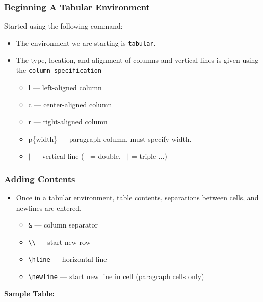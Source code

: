 \documentclass[notes=only]{beamer}
\newcommand{\snip}[1]
{
	
}
\newcommand{\pc}[1]
{
    \texttt{\textbackslash #1}
}
\begin{document}
\begin{frame} \frametitle{Beginning A Tabular Environment}
    Started using the following command:\\
    \snip{tabular.tex}
    \begin{itemize}
        \item The environment we are starting is \texttt{tabular}.
        \item The type, location, and alignment of columns and vertical lines is given using the \texttt{column specification}
	    \begin{itemize}
	        \item l --- left-aligned column
	        \item c --- center-aligned column
	        \item r --- right-aligned column
	        \item p\{width\} --- paragraph column, must specify width.
	        \item $|$ --- vertical line ($||$ = double, $|||$ = 	triple ...) 
	    \end{itemize}
    \end{itemize}
\end{frame}

\begin{frame} \frametitle{Adding Contents}
    \begin{itemize}
    	\item Once in a tabular environment, table contents, separations between cells, and newlines are entered.\\
    	\begin{itemize}
			\item \texttt{\&} --- column separator
			\item \texttt{\textbackslash\textbackslash} --- start new row
        	\item \pc{hline} --- horizontal line
			\item \pc{newline} --- start new line in cell (paragraph cells only)
		\end{itemize}
    \end{itemize}
    
    \textbf{Sample Table:}
    
\end{frame}
\end{document}

